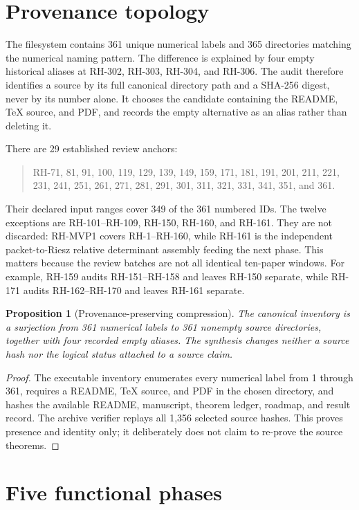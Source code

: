 \documentclass[11pt]{article}
\newtheorem{proposition}[theorem]{Proposition}
\theoremstyle{definition}
\theoremstyle{remark}
\begin{document}
\section{Provenance topology}

The filesystem contains 361 unique numerical labels and 365 directories
matching the numerical naming pattern.  The difference is explained by four
empty historical aliases at RH-302, RH-303, RH-304, and RH-306.  The audit
therefore identifies a source by its full canonical directory path and a
SHA-256 digest, never by its number alone.  It chooses the candidate containing
the README, TeX source, and PDF, and records the empty alternative as an alias
rather than deleting it.

There are 29 established review anchors:
\begin{quote}\small
RH-71, 81, 91, 100, 119, 129, 139, 149, 159, 171, 181, 191, 201,
211, 221, 231, 241, 251, 261, 271, 281, 291, 301, 311, 321, 331,
341, 351, and 361.
\end{quote}
Their declared input ranges cover 349 of the 361 numbered IDs.  The twelve
exceptions are RH-101--RH-109, RH-150, RH-160, and RH-161.  They are not
discarded: RH-MVP1 covers RH-1--RH-160, while RH-161 is the independent
packet-to-Riesz relative determinant assembly feeding the next phase.  This
matters because the review batches are not all identical ten-paper windows.
For example, RH-159 audits RH-151--RH-158 and leaves RH-150 separate, while
RH-171 audits RH-162--RH-170 and leaves RH-161 separate.

\begin{proposition}[Provenance-preserving compression]
The canonical inventory is a surjection from 361 numerical labels to 361
nonempty source directories, together with four recorded empty aliases.  The
synthesis changes neither a source hash nor the logical status attached to a
source claim.
\end{proposition}
\begin{proof}
The executable inventory enumerates every numerical label from 1 through 361,
requires a README, TeX source, and PDF in the chosen directory, and hashes the
available README, manuscript, theorem ledger, roadmap, and result record.  The
archive verifier replays all 1,356 selected source hashes.  This proves
presence and identity only; it deliberately does not claim to re-prove the
source theorems.
\end{proof}

\section{Five functional phases}
\end{document}
